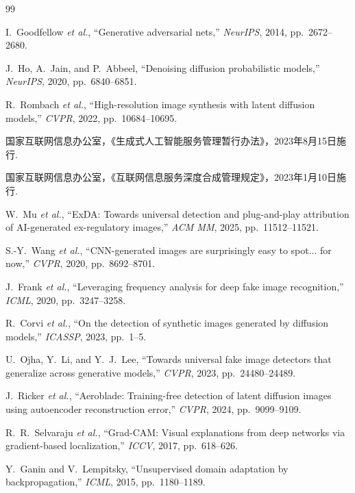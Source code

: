 \documentclass[UTF8, a4paper, 12pt]{ctexart}
\begin{document}
\begin{thebibliography}{99}

I.~Goodfellow \textit{et al.}, ``Generative adversarial nets,'' \textit{NeurIPS}, 2014, pp.~2672--2680.

J.~Ho, A.~Jain, and P.~Abbeel, ``Denoising diffusion probabilistic models,'' \textit{NeurIPS}, 2020, pp.~6840--6851.

R.~Rombach \textit{et al.}, ``High-resolution image synthesis with latent diffusion models,'' \textit{CVPR}, 2022, pp.~10684--10695.

国家互联网信息办公室，《生成式人工智能服务管理暂行办法》，2023年8月15日施行.

国家互联网信息办公室，《互联网信息服务深度合成管理规定》，2023年1月10日施行.

W.~Mu \textit{et al.}, ``ExDA: Towards universal detection and plug-and-play attribution of AI-generated ex-regulatory images,'' \textit{ACM MM}, 2025, pp.~11512--11521.

S.-Y.~Wang \textit{et al.}, ``CNN-generated images are surprisingly easy to spot... for now,'' \textit{CVPR}, 2020, pp.~8692--8701.

J.~Frank \textit{et al.}, ``Leveraging frequency analysis for deep fake image recognition,'' \textit{ICML}, 2020, pp.~3247--3258.

R.~Corvi \textit{et al.}, ``On the detection of synthetic images generated by diffusion models,'' \textit{ICASSP}, 2023, pp.~1--5.

U.~Ojha, Y.~Li, and Y.~J.~Lee, ``Towards universal fake image detectors that generalize across generative models,'' \textit{CVPR}, 2023, pp.~24480--24489.

J.~Ricker \textit{et al.}, ``Aeroblade: Training-free detection of latent diffusion images using autoencoder reconstruction error,'' \textit{CVPR}, 2024, pp.~9099--9109.

R.~R.~Selvaraju \textit{et al.}, ``Grad-CAM: Visual explanations from deep networks via gradient-based localization,'' \textit{ICCV}, 2017, pp.~618--626.

Y.~Ganin and V.~Lempitsky, ``Unsupervised domain adaptation by backpropagation,'' \textit{ICML}, 2015, pp.~1180--1189.


\end{thebibliography}
\end{document}
